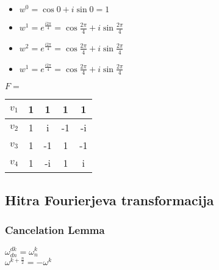 \documentclass{article}
\begin{document}
\begin{multicols}{4}
\begin{itemize}
    \item $w^0 = \cos0 + i\sin0 = 1$
    \item $w^1 = e^{\frac{i 2 \pi} {4}} = \cos \frac{2\pi}{4} + i\sin\frac{2\pi}{4}$
    \item $w^2 = e^{\frac{i 2 \pi} {4}} = \cos \frac{2\pi}{4} + i\sin\frac{2\pi}{4}$
    \item $w^1 = e^{\frac{i 2 \pi} {4}} = \cos \frac{2\pi}{4} + i\sin\frac{2\pi}{4}$
\end{itemize}

\begin{center}
    $F =$
    \begin{tabular}{ |c|c|c|c|c| } 
        \hline
        $v_1$ &     1 & 1 & 1 & 1 \\ 
        \hline
        $v_2$ &     1 & i & -1 & -i \\  
        \hline
        $v_3$ &     1 & -1 & 1 & -1 \\
        \hline
        $v_4$ &     1 & -i & 1 & i \\
        \hline
    \end{tabular}
\end{center}

\subsection{Hitra Fourierjeva transformacija}

\subsubsection{Cancelation Lemma}

\begin{center}
    \begin{math}
        \omega^{dk}_{dn} = \omega^{k}_{n}
    \end{math} \\
    \begin{math}
        \omega^{k + \frac{n}{2}} = -\omega^{k}
    \end{math}
\end{center}

\end{multicols}
\end{document}
